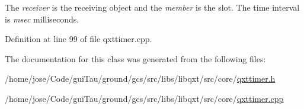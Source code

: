 The {\itshape receiver} is the receiving object and the {\itshape member} is the slot. The time interval is {\itshape msec} milliseconds. 

Definition at line 99 of file qxttimer.\-cpp.



The documentation for this class was generated from the following files\-:\begin{DoxyCompactItemize}
\item 
/home/jose/\-Code/gui\-Tau/ground/gcs/src/libs/libqxt/src/core/\hyperlink{qxttimer_8h}{qxttimer.\-h}\item 
/home/jose/\-Code/gui\-Tau/ground/gcs/src/libs/libqxt/src/core/\hyperlink{qxttimer_8cpp}{qxttimer.\-cpp}\end{DoxyCompactItemize}
